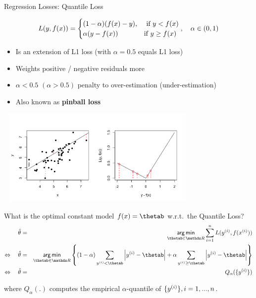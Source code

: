 \begin{vbframe}{Regression Losses: Quantile Loss}
\vspace{-0.3cm}

\footnotesize
$$
L(y, f(x)) = \begin{cases} (1 - \alpha) (f(x) - y), & \text{ if } y < f(x)\\
\alpha (y - f(x)) & \text{if } y \ge f(x)
\end{cases}, \quad \alpha \in (0, 1)
$$


\normalsize
\begin{itemize}
\item Is an extension of L1 loss (with $\alpha = 0.5$ equals L1 loss)
\item Weights positive / negative residuals more 
\item $\alpha<0.5$ $(\alpha>0.5)$ penalty to over-estimation (under-estimation)
\item Also known as \textbf{pinball loss}
\end{itemize}

\vspace*{-0.5cm}

\begin{center}
\includegraphics[width = 10cm, height = 4.7cm]{figure_man/2_3_loss_pinball_plot2.png}
\end{center}

\framebreak

What is the optimal constant model $\fx = \thetab$ w.r.t.\ the Quantile Loss?
\vspace{-0.2cm}
\begin{eqnarray*}
\thetah&=& \argmin_{\thetab\in \R}\sumin \Lxyi \\
\Leftrightarrow\quad 
\thetah &=& \argmin_{\thetab \in \R}\left\{ (1 - \alpha) \sum_{\yi<\thetab}  \left|\yi-\thetab\right| + \alpha \sum_{\yi \geq\thetab}  \left|\yi-\thetab\right|\right\} \\
\Leftrightarrow\quad \thetah &=& Q_\alpha(\{\yi\})
\end{eqnarray*}

where $Q_\alpha(.)$ computes the empirical $\alpha$-quantile of $\{y^{(i)}\}, i = 1, ..., n$.


\end{vbframe}

